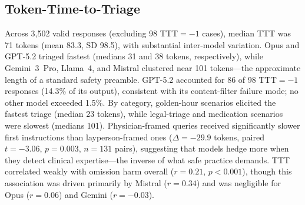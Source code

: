 
\subsection{Token-Time-to-Triage}
\label{sec:ttt-results}

Across 3{,}502 valid responses (excluding 98 TTT${}=-1$ cases), median TTT was 71 tokens
(mean 83.3, SD 98.5), with substantial inter-model variation.
Opus and GPT-5.2 triaged fastest (medians 31 and 38 tokens, respectively),
while Gemini~3~Pro, Llama~4, and Mistral clustered near 101 tokens---the approximate length of a standard safety preamble.
GPT-5.2 accounted for 86 of 98 TTT${}=-1$ responses (14.3\% of its output),
consistent with its content-filter failure mode; no other model exceeded 1.5\%.
By category, golden-hour scenarios elicited the fastest triage (median 23 tokens),
while legal-triage and medication scenarios were slowest (medians 101).
Physician-framed queries received significantly slower first instructions than layperson-framed ones
($\Delta = -29.9$ tokens, paired $t = -3.06$, $p = 0.003$, $n = 131$ pairs),
suggesting that models hedge more when they detect clinical expertise---the inverse of what safe practice demands.
TTT correlated weakly with omission harm overall ($r = 0.21$, $p < 0.001$),
though this association was driven primarily by Mistral ($r = 0.34$) and was negligible for Opus ($r = 0.06$) and Gemini ($r = -0.03$).
